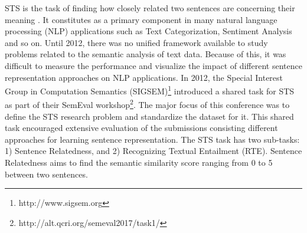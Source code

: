 \documentclass[12pt]{report} %
\begin{document}
     STS is the task of finding how closely related two sentences are concerning their meaning \citep{agirre2012semeval}. It constitutes as a primary component in many natural language processing (NLP) applications such as Text Categorization, Sentiment Analysis and so on. Until 2012, there was no unified framework available to study problems related to the semantic analysis of text data. Because of this, it was difficult to measure the performance and visualize the impact of different sentence representation approaches on NLP applications. In 2012, the Special Interest Group in Computation Semantics (SIGSEM)\footnote{http://www.sigsem.org} introduced a shared task for STS as part of their SemEval workshop\footnote{http://alt.qcri.org/semeval2017/task1/}. The major focus of this conference was to define the STS research problem and standardize the dataset for it. This shared task encouraged extensive evaluation of the submissions consisting different approaches for learning sentence representation. The STS task has two sub-tasks: 1) Sentence Relatedness, and 2) Recognizing Textual Entailment (RTE). Sentence Relatedness aims to find the semantic similarity score ranging from 0 to 5 between two sentences. 
    
\end{document}
